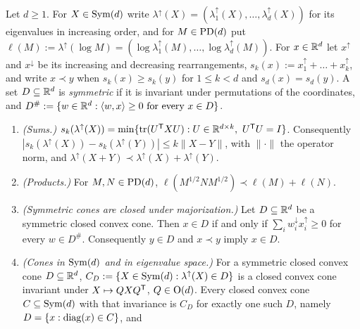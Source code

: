 \begin{lemma}
\label{lem:spectral-cones}
\leanok
Let $d \ge 1$. For $X \in \mathrm{Sym}(d)$ write $\lambda^\uparrow(X) = (\lambda^\uparrow_1(X), \dots,
\lambda^\uparrow_d(X))$ for its eigenvalues in increasing order, and for $M \in \mathrm{PD}(d)$ put
$\ell(M) := \lambda^\uparrow(\log M) = (\log\lambda^\uparrow_1(M), \dots, \log\lambda^\uparrow_d(M))$. For
$x \in \mathbb{R}^d$ let $x^\uparrow$ and $x^\downarrow$ be its increasing and decreasing rearrangements,
$s_k(x) := x^\uparrow_1 + \dots + x^\uparrow_k$, and write $x \prec y$ when $s_k(x) \ge s_k(y)$ for
$1 \le k < d$ and $s_d(x) = s_d(y)$. A set $D \subseteq \mathbb{R}^d$ is \emph{symmetric} if it is invariant
under permutations of the coordinates, and $D^\# := \{w \in \mathbb{R}^d : \langle w, x\rangle \ge 0 \text{ for
every } x \in D\}$.
\begin{enumerate}
\item \emph{(Sums.)} $s_k(\lambda^\uparrow(X)) = \min\{\operatorname{tr}(U^{\mathsf{T}}XU) : U \in \mathbb{R}^{d\times k},\
U^{\mathsf{T}}U = I\}$. Consequently $|s_k(\lambda^\uparrow(X)) - s_k(\lambda^\uparrow(Y))| \le k\|X - Y\|$, with
$\|\cdot\|$ the operator norm, and $\lambda^\uparrow(X + Y) \prec \lambda^\uparrow(X) + \lambda^\uparrow(Y)$.
\item \emph{(Products.)} For $M, N \in \mathrm{PD}(d)$, $\ell(M^{1/2}NM^{1/2}) \prec \ell(M) + \ell(N)$.
\item \emph{(Symmetric cones are closed under majorization.)} Let $D \subseteq \mathbb{R}^d$ be a symmetric
closed convex cone. Then $x \in D$ if and only if $\sum_iw^\downarrow_ix^\uparrow_i \ge 0$ for every
$w \in D^\#$. Consequently $y \in D$ and $x \prec y$ imply $x \in D$.
\item \emph{(Cones in $\mathrm{Sym}(d)$ and in eigenvalue space.)} For a symmetric closed convex cone
$D \subseteq \mathbb{R}^d$, $C_D := \{X \in \mathrm{Sym}(d) : \lambda^\uparrow(X) \in D\}$ is a closed convex cone
invariant under $X \mapsto QXQ^{\mathsf{T}}$, $Q \in \mathrm{O}(d)$. Every closed convex cone $C \subseteq \mathrm{Sym}(d)$
with that invariance is $C_D$ for exactly one such $D$, namely $D = \{x : \operatorname{diag}(x) \in C\}$, and

\end{enumerate}
\end{lemma}
